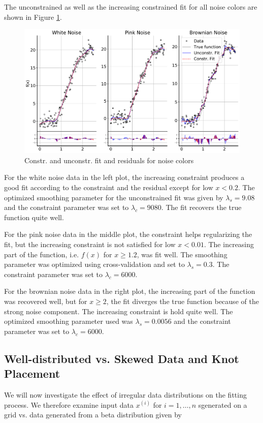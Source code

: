 \documentclass[10pt,a4paper]{article}
\begin{document}
The unconstrained as well as the increasing constrained fit for all noise colors are shown in Figure \ref{fig:fit_noise_colors}.

\begin{figure}[H]
	\centering
	\includegraphics[width=\columnwidth]{../thesisplots/exp_noise_colors.pdf}
	\caption{Constr. and unconstr. fit and residuals for noise colors}
	\label{fig:fit_noise_colors}
\end{figure}

For the white noise data in the left plot, the increasing constraint produces a good fit according to the constraint and the residual except for low $x < 0.2$. The optimized smoothing parameter for the unconstrained fit was given by $\lambda_s = 9.08$ and the constraint parameter was set to $\lambda_c = 9080$. The fit recovers the true function quite well. 

For the pink noise data in the middle plot, the constraint helps regularizing the fit, but the increasing constraint is not satisfied for low $x<0.01$. The increasing part of the function, i.e. $f(x)$ for $x \ge 1.2$,  was fit well. The smoothing parameter was optimized using cross-validation and set to $\lambda_s = 0.3$. The constraint parameter was set to $\lambda_c = 6000$. 

For the brownian noise data in the right plot, the increasing part of the function was recovered well, but for $x \ge 2$, the fit diverges the true function because of the strong noise component. The increasing constraint is hold quite well. The optimized smoothing parameter used was $\lambda_s = 0.0056$ and the constraint parameter was set to $\lambda_c = 6000$.

\subsection{Well-distributed vs. Skewed Data and Knot Placement}
We will now investigate the effect of irregular data distributions on the fitting process. We therefore examine input data $x^{(i)}$ for $i = 1, \dots, n$ sgenerated on a grid vs. data generated from a beta distribution given by
\end{document}
